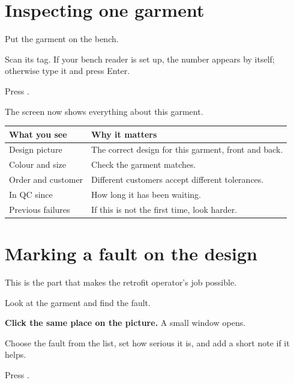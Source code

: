 \section{Inspecting one garment}

\begin{steps}
  \item Put the garment on the bench.
  \item Scan its tag. If your bench reader is set up, the number appears by
        itself; otherwise type it and press Enter.
  \item Press .
\end{steps}

The screen now shows everything about this garment.


\begin{table}[H]
\centering
\small
\begin{tabular}{@{}p{34mm}p{104mm}@{}}
\toprule
\textbf{What you see} & \textbf{Why it matters} \\
\midrule
Design picture      & The correct design for this garment, front and back. \\
Colour and size     & Check the garment matches. \\
Order and customer  & Different customers accept different tolerances. \\
In QC since         & How long it has been waiting. \\
Previous failures   & If this is not the first time, look harder. \\
\bottomrule
\end{tabular}
\end{table}

\section{Marking a fault on the design}

This is the part that makes the retrofit operator's job possible.

\begin{steps}
  \item Look at the garment and find the fault.
  \item \textbf{Click the same place on the picture.} A small window opens.
  \item Choose the fault from the list, set how serious it is, and add a short
        note if it helps.
  \item Press .
\end{steps}

